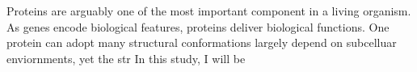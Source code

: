 Proteins are arguably one of the most important component in a living organism. As genes encode biological features, proteins deliver biological functions. One protein can adopt many structural conformations largely depend on subcelluar enviornments, yet the str    In this study, I will be 